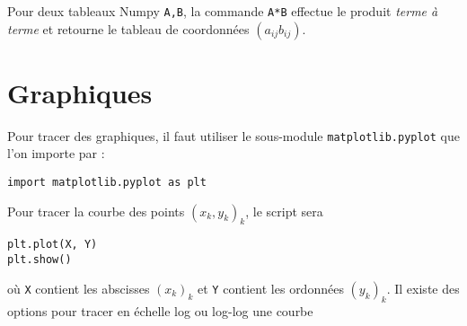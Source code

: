 \documentclass[11pt,a4paper]{article}
\begin{document}
\begin{tcolorbox}[colback=yellow!10!white,colframe=red!75!black,title=Warning]
   Pour deux tableaux Numpy \verb|A,B|, la commande \verb|A*B| effectue le produit \emph{terme à terme} et retourne le tableau de coordonnées $(a_{ij} b_{ij})$.
\end{tcolorbox}


%
%
%

\section{Graphiques}

Pour tracer des graphiques, il faut utiliser le sous-module \verb|matplotlib.pyplot| que l'on importe par : 
\begin{verbatim}
import matplotlib.pyplot as plt
\end{verbatim}

Pour tracer la courbe des points $(x_k,y_k)_k$, le script sera
\begin{verbatim}
plt.plot(X, Y)
plt.show()
\end{verbatim}
où \verb|X| contient les abscisses $(x_k)_k$ et \verb|Y| contient les ordonnées $(y_k)_k$.
\newline
Il existe des options pour tracer en échelle log ou log-log une courbe
\end{document}
